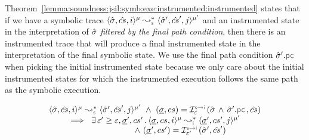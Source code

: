 Theorem~\ref{lemma:soundness:jsil:symb:exe:instrumented:instrumented} states 
that if we have a symbolic trace $\transabssemrule{\sstate, \scs, i}{\sstate', \scs', j}{\mode}{\mode'}{\symbolic}$
 and an instrumented state in the interpretation of $\hat{\sigma}$ \emph{filtered by the final 
 path condition}, then there is an instrumented trace that will produce a final instrumented state 
 in the interpretation of the final symbolic state. 
 We use the final path condition $\sstate'.\pcsel$ when picking the initial 
 instrumented state because we only care about the initial instrumented states for which 
the instrumented execution follows the same path as the symbolic execution. 



\begin{theorem}\label{lemma:soundness:jsil:symb:exe:instrumented:instrumented}
\vspace*{-0.1cm}
$$
\begin{array}{l}
\transabssemrule{\sstate, \scs, i}{\sstate', \scs', j}{\mode}{\mode'}{\symbolic}  \ \wedge \ (\istate, \cs) = \interpret{\symbinst}{\senv}(\sstate \, \wedge \, \sstate'.\pcsel, \scs) \\ \quad \quad 
    \ \implies \ \exists \, \senv' \geq \senv, \istate', \cs' \, . \, 
        \transabssemrule{\istate, \cs, i}{\istate', \cs', j}{\mode}{\mode'}{\instrumented} \\ \quad \quad \quad \quad  \quad \quad \quad \quad  \quad \quad
             \ \wedge \ (\istate', \cs') = \interpret{\symbinst}{\senv'}(\sstate', \scs')
\end{array}
$$
\end{theorem}



\vspace*{-0.25cm}
